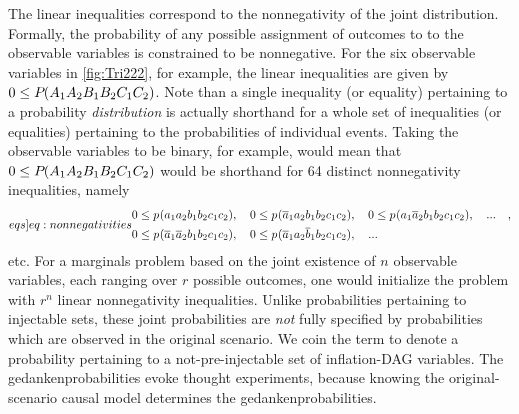 The linear inequalities correspond to the nonnegativity of the joint distribution. Formally, the probability of any possible assignment of outcomes to to the observable variables is constrained to be nonnegative. For the six observable variables in \cref{fig:Tri222}, for example, the linear inequalities are given by $0\leq {P_{}}\lparen A_1 A_2 B_1 B_2 C_1 C_2\rparen$. Note than a single inequality (or equality) pertaining to a probability \emph{distribution} is actually shorthand for a whole set of inequalities (or equalities) pertaining to the probabilities of individual events. Taking the observable variables to be binary, for example, would mean that $0\leq {P_{}}\lparen A_1 A_2 B_1 B_2 C_1 C_2\rparen$ would be shorthand for 64 distinct nonnegativity inequalities, namely
\begin{align}\label[eqs]{eq:nonnegativities}
\begin{split}
 & 0\leq \p{a_1 a_2 b_1 b_2 c_1 c_2} ,\quad
 0\leq \p{\n{a}_1 a_2 b_1 b_2 c_1 c_2} ,\quad
 0\leq \p{a_1 \n{a}_2 b_1 b_2 c_1 c_2} ,\quad...\quad,\\
 &
 0\leq \p{\n{a}_1 \n{a}_2 b_1 b_2 c_1 c_2} ,\quad
 0\leq \p{\n{a}_1 a_2 \n{b}_1 b_2 c_1 c_2}, \quad ...
\end{split}
\end{align}
etc. For a marginals problem based on the joint existence of $n$ observable variables, each ranging over $r$ possible outcomes, one would initialize the problem with $r^n$ linear nonnegativity inequalities. Unlike probabilities pertaining to injectable sets, these joint probabilities are \emph{not} fully specified by probabilities which are observed in the original scenario. We coin the term  to denote a probability pertaining to a not-pre-injectable set of inflation-DAG variables. The gedankenprobabilities evoke thought experiments, because knowing the original-scenario causal model determines the gedankenprobabilities. %

